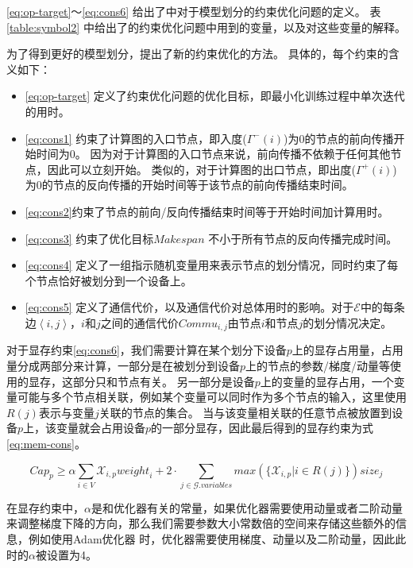 \ref{eq:op-target}～\ref{eq:cons6} 给出了\sys{}中对于模型划分的约束优化问题的定义。
表\ref{table:symbol2} 中给出了\sys{}的约束优化问题中用到的变量，以及对这些变量的解释。


为了得到更好的模型划分，\sys{}提出了新的约束优化的方法。
具体的，每个约束的含义如下：
\begin{itemize}
	\item \ref{eq:op-target} 定义了约束优化问题的优化目标，即最小化训练过程中单次迭代的用时。
	\item \ref{eq:cons1} 约束了计算图的入口节点，即入度($\Gamma^{-}(i)$)为0的节点的前向传播开始时间为0。
	因为对于计算图的入口节点来说，前向传播不依赖于任何其他节点，因此可以立刻开始。
	类似的，对于计算图的出口节点，即出度($\Gamma^{+}(i)$)为0的节点的反向传播的开始时间等于该节点的前向传播结束时间。
	\item \ref{eq:cons2}约束了节点的前向/反向传播结束时间等于开始时间加计算用时。
	\item \ref{eq:cons3} 约束了优化目标$\mathit{Makespan}$ 不小于所有节点的反向传播完成时间。
	\item \ref{eq:cons4} 定义了一组指示随机变量用来表示节点的划分情况，同时约束了每个节点恰好被划分到一个设备上。
	\item \ref{eq:cons5} 定义了通信代价，以及通信代价对总体用时的影响。对于$\mathcal{E}$中的每条边$\left\langle i,j\right\rangle $，$i$和$j$之间的通信代价$\mathit{Commu}_{i,j}$由节点$i$和节点$j$的划分情况决定。
\end{itemize}

对于显存约束\ref{eq:cons6}，我们需要计算在某个划分下设备$p$上的显存占用量，占用量分成两部分来计算，一部分是在被划分到设备$p$上的节点的参数/梯度/动量等使用的显存，这部分只和节点有关。
另一部分是设备$p$上的变量的显存占用，一个变量可能与多个节点相关联，例如某个变量可以同时作为多个节点的输入，这里使用$R(j)$表示与变量$j$关联的节点的集合。
当与该变量相关联的任意节点被放置到设备$p$上，该变量就会占用设备$p$的一部分显存，因此最后得到的显存约束为式\ref{eq:mem-cons}。

\begin{equation}
	\label{eq:mem-cons}
	\mathit{Cap}_p \ge \alpha  \sum_{i\in V} \mathcal{X}_{i,p} \mathit{weight}_i + 2\cdot \sum_{j\in \mathcal{G}.\mathit{variables}} \mathit{max}(\{\mathcal{X}_{i,p} |  i\in R(j)\}) \mathit{size}_{j}
\end{equation}

在显存约束中，$\alpha$是和优化器有关的常量，如果优化器需要使用动量或者二阶动量来调整梯度下降的方向，那么我们需要参数大小常数倍的空间来存储这些额外的信息，例如使用Adam优化器 时，优化器需要使用梯度、动量以及二阶动量，因此此时的$\alpha$被设置为4。

